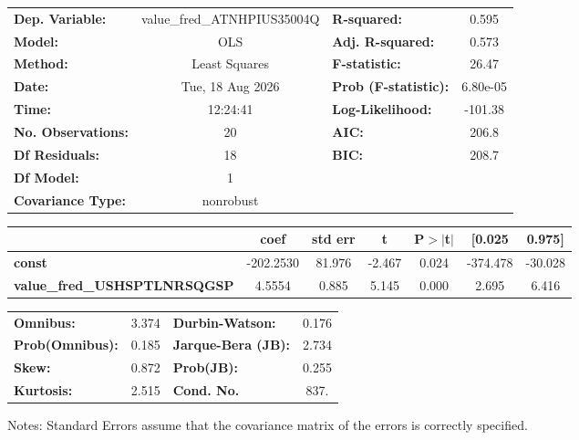 \begin{center}
\begin{tabular}{lclc}
\toprule
\textbf{Dep. Variable:}              & value\_fred\_ATNHPIUS35004Q & \textbf{  R-squared:         } &     0.595   \\
\textbf{Model:}                      &             OLS             & \textbf{  Adj. R-squared:    } &     0.573   \\
\textbf{Method:}                     &        Least Squares        & \textbf{  F-statistic:       } &     26.47   \\
\textbf{Date:}                       &       Tue, 18 Aug 2026      & \textbf{  Prob (F-statistic):} &  6.80e-05   \\
\textbf{Time:}                       &           12:24:41          & \textbf{  Log-Likelihood:    } &   -101.38   \\
\textbf{No. Observations:}           &                20           & \textbf{  AIC:               } &     206.8   \\
\textbf{Df Residuals:}               &                18           & \textbf{  BIC:               } &     208.7   \\
\textbf{Df Model:}                   &                 1           & \textbf{                     } &             \\
\textbf{Covariance Type:}            &          nonrobust          & \textbf{                     } &             \\
\bottomrule
\end{tabular}
\begin{tabular}{lcccccc}
                                     & \textbf{coef} & \textbf{std err} & \textbf{t} & \textbf{P$> |$t$|$} & \textbf{[0.025} & \textbf{0.975]}  \\
\midrule
\textbf{const}                       &    -202.2530  &       81.976     &    -2.467  &         0.024        &     -374.478    &      -30.028     \\
\textbf{value\_fred\_USHSPTLNRSQGSP} &       4.5554  &        0.885     &     5.145  &         0.000        &        2.695    &        6.416     \\
\bottomrule
\end{tabular}
\begin{tabular}{lclc}
\textbf{Omnibus:}       &  3.374 & \textbf{  Durbin-Watson:     } &    0.176  \\
\textbf{Prob(Omnibus):} &  0.185 & \textbf{  Jarque-Bera (JB):  } &    2.734  \\
\textbf{Skew:}          &  0.872 & \textbf{  Prob(JB):          } &    0.255  \\
\textbf{Kurtosis:}      &  2.515 & \textbf{  Cond. No.          } &     837.  \\
\bottomrule
\end{tabular}
\end{center}

Notes: \newline
 [1] Standard Errors assume that the covariance matrix of the errors is correctly specified.